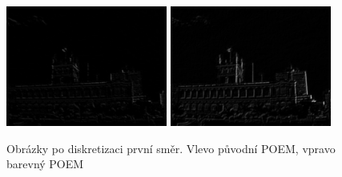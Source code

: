 \documentclass{report}
\begin{document}
\begin{figure}[H]
	\centering	
	\includegraphics[width=150pt]{./img/aems2.jpg}
	\includegraphics[width=150pt]{./img/aems_3_2.jpg}
	\caption{Obrázky po diskretizaci první směr. Vlevo původní POEM, vpravo barevný POEM}
\end{figure}
\end{document}
